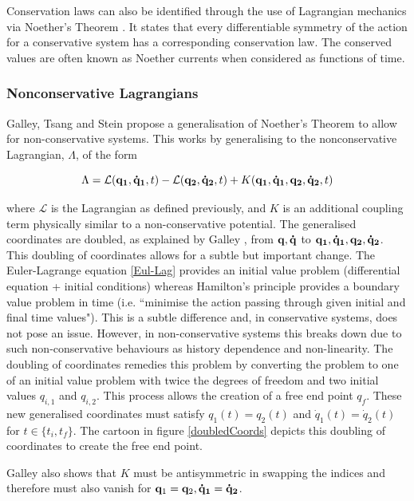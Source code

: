 \documentclass[10pt]{iopart}
\begin{document}
Conservation laws can also be identified through the use of Lagrangian mechanics via Noether's Theorem \cite{Goldstein}. It states that every differentiable symmetry of the action for a conservative system has a corresponding conservation law. The conserved values are often known as Noether currents when considered as functions of time. 

\subsubsection{Nonconservative Lagrangians \\}
Galley, Tsang and Stein \cite{GalleyEtAl} propose a generalisation of Noether's Theorem to allow for non-conservative systems. This works by generalising to the nonconservative Lagrangian, $\Lambda$, of the form 

\begin{equation}
\label{non-con-lagran}
	\Lambda = \mathcal{L}(\bold{q_1,\dot q_1},t) - \mathcal{L}(\bold{q_2,\dot q_2},t) + K(\bold{q_1,\dot q_1,q_2,\dot q_2},t)
\end{equation}

where $\mathcal{L}$ is the Lagrangian as defined previously, and $K$ is an additional coupling term physically similar to a non-conservative potential. The generalised coordinates are doubled, as explained by Galley \cite{Galley}, from $\bold{q,\dot q}$ to $\bold{q_1,\dot q_1, q_2, \dot q_2}$. This doubling of coordinates allows for a subtle but important change. The Euler-Lagrange equation \ref{Eul-Lag} provides an initial value problem (differential equation + initial conditions) whereas Hamilton's principle provides a boundary value problem in time (i.e. ``minimise the action passing through given initial and final time values"). This is a subtle difference and, in conservative systems, does not pose an issue. However, in non-conservative systems this breaks down due to such non-conservative behaviours as history dependence and non-linearity. The doubling of coordinates remedies this problem by converting the problem to one of an initial value problem with twice the degrees of freedom and two initial values $q_{i,1}$ and $q_{i,2}$. This process allows the creation of a free end point $q_f$. These new generalised coordinates must satisfy $q_1(t) = q_2(t)$ and $\dot q_1(t) = \dot q_2(t)$ for $t \in \{t_i, t_f\}$. The cartoon in figure \ref{doubledCoords} depicts this doubling of coordinates to create the free end point.

Galley \cite{Galley} also shows that $K$ must be antisymmetric in swapping the indices and therefore must also vanish for $\bold q_1 =\bold q_2,\bold{\dot q_1} =\bold{\dot q_2}$.
\end{document}

